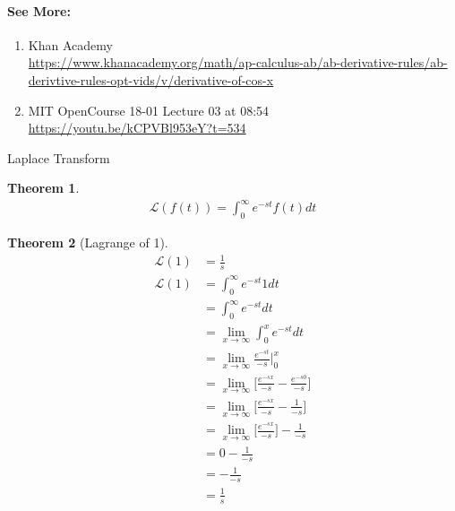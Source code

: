 \documentclass{article}
\newtheorem{theorem}{Theorem}[section]
\theoremstyle{definition}
\begin{document}
\paragraph{See More:}
\begin{enumerate}
	\item {Khan Academy\\
\url{https://www.khanacademy.org/math/ap-calculus-ab/ab-derivative-rules/ab-derivtive-rules-opt-vids/v/derivative-of-cos-x}}
	\item {MIT OpenCourse 18-01 Lecture 03 at 08:54\\
\url{https://youtu.be/kCPVBl953eY?t=534}}
\end{enumerate}

\clearpage
Laplace Transform
\begin{theorem}
	\begin{align*}
		\mathcal{L}(f(t)) = \int_{0}^{\infty}{e^{-st}f(t)dt}
	\end{align*}
\end{theorem}
\clearpage
\begin{theorem}[Lagrange of 1]
	\begin{align*}
		\mathcal{L}(1) &= \frac{1}{s}\\
		\mathcal{L}(1) &=\int_{0}^{\infty}{e^{-st}1dt}\\
		&=\int_{0}^{\infty}{e^{-st}dt}\\
		&=\lim_{x \to \infty}{\int_{0}^{x}{e^{-st}dt}}\\
		&=\lim_{x \to \infty}{\frac{e^{-st}}{-s}} \bigg\rvert_{0}^{x}\\
		&=\lim_{x \to \infty}\bigg[{\frac{e^{-sx}}{-s} - \frac{e^{-s0}}{-s}}\bigg]\\
		&=\lim_{x \to \infty}\bigg[{\frac{e^{-sx}}{-s} - \frac{1}{-s}}\bigg]\\
		&=\lim_{x \to \infty}\bigg[{\frac{e^{-sx}}{-s}\bigg] - \frac{1}{-s}}\\
		&=0 - \frac{1}{-s}\\
		&=-\frac{1}{-s}\\
		&=\frac{1}{s}\\
	\end{align*}
\end{theorem}
\end{document}
